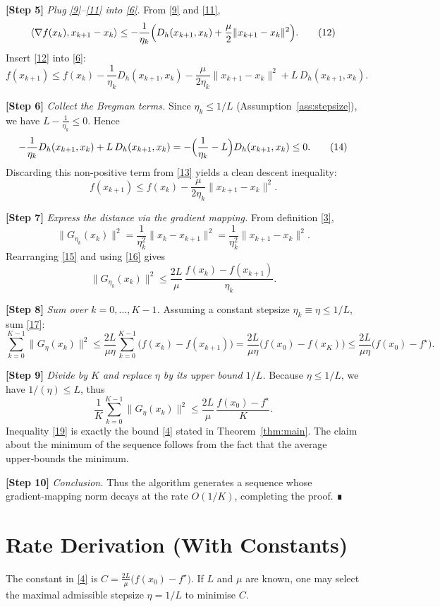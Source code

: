 \documentclass{article}
\newcommand{\grad}{\nabla}
\newcommand{\Breg}{D_{h}}
\begin{document}
\noindent\textbf{[Step 5]} \emph{Plug \eqref{9}–\eqref{11} into \eqref{6}.}  
From \eqref{9} and \eqref{11},
\[
\langle \grad f(x_k),x_{k+1}-x_k\rangle
   \le -\frac{1}{\eta_k}\Bigl(\Breg (x_{k+1},x_k)+\frac{\mu}{2}\|x_{k+1}-x_k\|^{2}\Bigr).
\tag{12}
\]
Insert \eqref{12} into \eqref{6}:
\[
f(x_{k+1})\le f(x_k)
   -\frac{1}{\eta_k}\Breg (x_{k+1},x_k)
   -\frac{\mu}{2\eta_k}\|x_{k+1}-x_k\|^{2}
   +L\,\Breg (x_{k+1},x_k).
\tag{13}
\]

\noindent\textbf{[Step 6]} \emph{Collect the Bregman terms.}  
Since $\eta_k\le 1/L$ (Assumption~\ref{ass:stepsize}), we have $L-\frac{1}{\eta_k}\le 0$. Hence
\[
-\frac{1}{\eta_k}\Breg (x_{k+1},x_k)+L\,\Breg (x_{k+1},x_k)
   = -\Bigl(\frac{1}{\eta_k}-L\Bigr)\Breg (x_{k+1},x_k)
   \le 0 .
\tag{14}
\]
Discarding this non‑positive term from \eqref{13} yields a clean descent inequality:
\[
f(x_{k+1})\le f(x_k)-\frac{\mu}{2\eta_k}\|x_{k+1}-x_k\|^{2}.
\tag{15}
\]

\noindent\textbf{[Step 7]} \emph{Express the distance via the gradient mapping.}  
From definition \eqref{3},
\[
\|G_{\eta_k}(x_k)\|^{2}
   =\frac{1}{\eta_k^{2}}\|x_k-x_{k+1}\|^{2}
   =\frac{1}{\eta_k^{2}}\|x_{k+1}-x_k\|^{2}.
\tag{16}
\]
Rearranging \eqref{15} and using \eqref{16} gives
\[
\|G_{\eta_k}(x_k)\|^{2}
   \le \frac{2L}{\mu}\,\frac{f(x_k)-f(x_{k+1})}{\eta_k}.
\tag{17}
\]

\noindent\textbf{[Step 8]} \emph{Sum over $k=0,\dots,K-1$.}  
Assuming a constant stepsize $\eta_k\equiv\eta\le 1/L$, sum \eqref{17}:
\[
\sum_{k=0}^{K-1}\|G_{\eta}(x_k)\|^{2}
   \le \frac{2L}{\mu\eta}\sum_{k=0}^{K-1}\bigl(f(x_k)-f(x_{k+1})\bigr)
   =\frac{2L}{\mu\eta}\bigl(f(x_0)-f(x_K)\bigr)
   \le\frac{2L}{\mu\eta}\bigl(f(x_0)-f^\star\bigr).
\tag{18}
\]

\noindent\textbf{[Step 9]} \emph{Divide by $K$ and replace $\eta$ by its upper bound $1/L$.}  
Because $\eta\le 1/L$, we have $1/(\eta)\le L$, thus
\[
\frac{1}{K}\sum_{k=0}^{K-1}\|G_{\eta}(x_k)\|^{2}
   \le \frac{2L}{\mu}\,\frac{f(x_0)-f^\star}{K}.
\tag{19}
\]
Inequality \eqref{19} is exactly the bound \eqref{4} stated in Theorem~\ref{thm:main}. The claim about the minimum of the sequence follows from the fact that the average upper‑bounds the minimum.

\noindent\textbf{[Step 10]} \emph{Conclusion.}  
Thus the algorithm generates a sequence whose gradient‑mapping norm decays at the rate $O(1/K)$, completing the proof. ∎

\section*{Rate Derivation (With Constants)}
The constant in \eqref{4} is $\displaystyle C=\frac{2L}{\mu}\bigl(f(x_0)-f^\star\bigr)$.  
If $L$ and $\mu$ are known, one may select the maximal admissible stepsize $\eta=1/L$ to minimise $C$.
\end{document}
